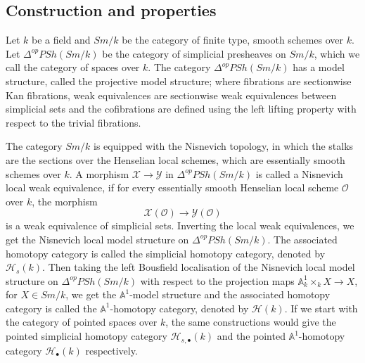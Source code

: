 \documentclass[11pt, reqno]{amsart}
\theoremstyle{plain}
\theoremstyle{definition}
\newcommand{\sH}{{\mathcal H}}
\newcommand{\sO}{{\mathcal O}}
\newcommand{\sX}{{\mathcal X}}
\newcommand{\sY}{{\mathcal Y}}
\newcommand{\A}{{\mathbb A}}
\begin{document}
		\subsection{Construction and properties}
 Let $k$ be a field and $Sm/k$ be the category of finite type, smooth schemes over $k$. Let $\Delta^{op}PSh(Sm/k)$ be the category of simplicial presheaves on $Sm/k$, which we call the category of spaces over $k$. The category $\Delta^{op}PSh(Sm/k)$ has a model structure, called the projective model structure; where fibrations are sectionwise Kan fibrations, 
weak equivalences are sectionwise weak equivalences between simplicial sets and the cofibrations are defined using the left lifting property with respect to the trivial fibrations.\par
The category $Sm/k$ is equipped with the Nisnevich topology, in which the stalks are the sections over the Henselian  local schemes, which are essentially smooth schemes over $k$. A morphism $\sX \to \sY$ in $\Delta^{op}PSh(Sm/k)$ is called a Nisnevich local weak equivalence, if for every essentially smooth Henselian local scheme $\sO$ over $k$, the morphism
$$\sX(\sO) \to \sY (\sO)$$ 
is a weak equivalence of simplicial sets. Inverting the local weak equivalences, we get the Nisnevich local model structure on $\Delta^{op}PSh(Sm/k)$. The associated homotopy category is called the simplicial homotopy category, denoted by $\sH_s(k)$. Then taking the left Bousfield localisation of the Nisnevich local model structure on $\Delta^{op}PSh(Sm/k)$ with respect to the projection maps $\A^1_k\times_k X \to X$, for $X \in Sm/k$, we get the $\mathbb{A}^1$-model structure and the associated homotopy category is called the $\A^1$-homotopy category, denoted by $\sH(k)$. If we start with the category of pointed spaces over $k$, the same constructions would give the pointed simplicial homotopy category $\sH_{s, \bullet}(k)$ and the pointed $\mathbb{A}^1$-homotopy category $\mathcal{H}_\bullet(k)$ respectively.
\end{document}
